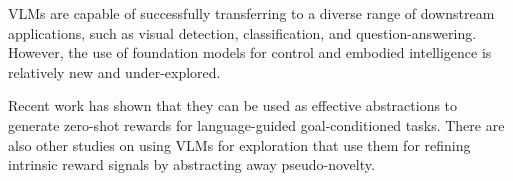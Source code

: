 VLMs are capable of successfully transferring to a diverse range of downstream applications, such as visual detection, classification, and question-answering.
However, the use of foundation models for control and embodied intelligence is relatively new and under-explored.

% 

Recent work \citep{zest,negprompt,vlmrm,lamp} has shown that they can be used as effective abstractions to generate zero-shot rewards for language-guided goal-conditioned tasks.
There are also other studies on using VLMs for exploration \citep{vlmlang,vlmdistill} that use them for refining intrinsic reward signals by abstracting away pseudo-novelty. 

